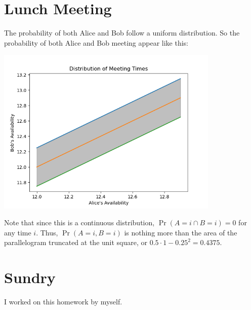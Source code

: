 \documentclass{article}
\begin{document}
\section{Lunch Meeting}

The probability of both Alice and Bob follow a uniform distribution.
So the probability of both Alice and Bob meeting appear like this:
\begin{center}
    \includegraphics[width=0.8\textwidth]{q4.png}
\end{center}
Note that since this is a continuous distribution, \(\Pr(A = i \cap B = i) = 0\) for any time \(i\).
Thus, \(\Pr(A = i, B = i)\) is nothing more than the area of the parallelogram truncated at the unit square, or \(0.5 \cdot 1 - 0.25^2 = \num{0.4375}\).

\section{Sundry}

I worked on this homework by myself.
\end{document}
